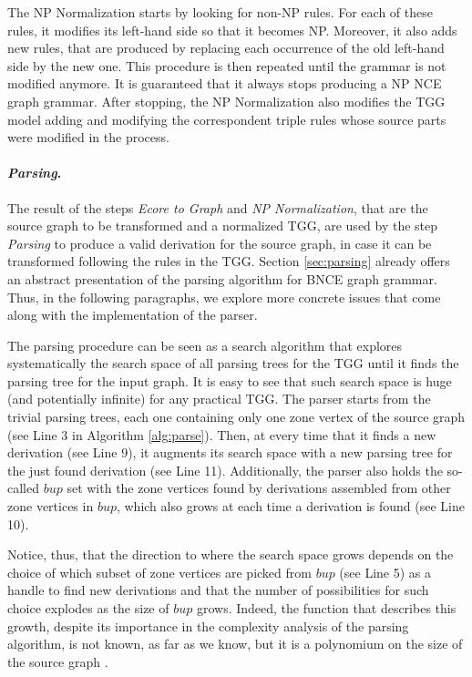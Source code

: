 The NP Normalization starts by looking for non-NP rules. For each of these rules, it modifies its left-hand side so that it becomes NP. Moreover, it also adds new rules, that are produced by replacing each occurrence of the old left-hand side by the new one. This procedure is then repeated until the grammar is not modified anymore. It is guaranteed that it always stops producing a NP NCE graph grammar. After stopping, the NP Normalization also modifies the TGG model adding and modifying the correspondent triple rules whose source parts were modified in the process.


\paragraph*{\textit{Parsing}.} The result of the steps \textit{Ecore to Graph} and \textit{NP Normalization}, that are the source graph to be transformed and a normalized TGG, are used by the step \textit{Parsing} to produce a valid derivation for the source graph, in case it can be transformed following the rules in the TGG. Section \ref{sec:parsing} already offers an abstract presentation of the parsing algorithm for BNCE graph grammar. Thus, in the following paragraphs, we explore more concrete issues that come along with the implementation of the parser.

The parsing procedure can be seen as a search algorithm that explores systematically the search space of all parsing trees for the TGG until it finds the parsing tree for the input graph. It is easy to see that such search space is huge (and potentially infinite) for any practical TGG. The parser starts from the trivial parsing trees, each one containing only one zone vertex of the source graph (see Line 3 in Algorithm \ref{alg:parse}). Then, at every time that it finds a new derivation (see Line 9), it augments its search space with a new parsing tree for the just found derivation (see Line 11). Additionally, the parser also holds the so-called $bup$ set with the zone vertices found by derivations assembled from other zone vertices in $bup$, which also grows at each time a derivation is found (see Line 10).

Notice, thus, that the direction to where the search space grows depends on the choice of which subset of zone vertices are picked from $bup$ (see Line 5) as a handle to find new derivations and that the number of possibilities for such choice explodes as the size of $bup$ grows. Indeed, the function that describes this growth, despite its importance in the complexity analysis of the parsing algorithm, is not known, as far as we know, but it is a polynomium on the size of the source graph \cite[p. 160]{rozenberg1986boundary}.

